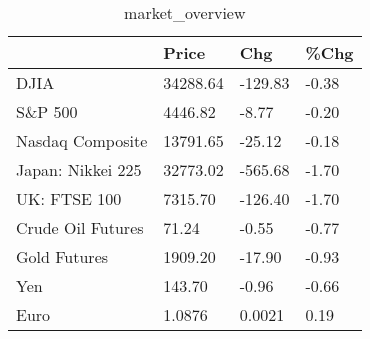 \documentclass{article}%
\begin{document}
%


\begin{table}[htbp]%
\caption{market\_overview}%
\centering%
\begin{adjustbox}{width=1\textwidth}%
\begin{tabular}{llll}
\toprule
                  &    Price &     Chg &  \%Chg \\
\midrule
             DJIA & 34288.64 & -129.83 & -0.38 \\
          S\&P 500 &  4446.82 &   -8.77 & -0.20 \\
 Nasdaq Composite & 13791.65 &  -25.12 & -0.18 \\
Japan: Nikkei 225 & 32773.02 & -565.68 & -1.70 \\
     UK: FTSE 100 &  7315.70 & -126.40 & -1.70 \\
Crude Oil Futures &    71.24 &   -0.55 & -0.77 \\
     Gold Futures &  1909.20 &  -17.90 & -0.93 \\
              Yen &   143.70 &   -0.96 & -0.66 \\
             Euro &   1.0876 &  0.0021 &  0.19 \\
\bottomrule
\end{tabular}
%
\end{adjustbox}%
\end{table}

%
\end{document}
